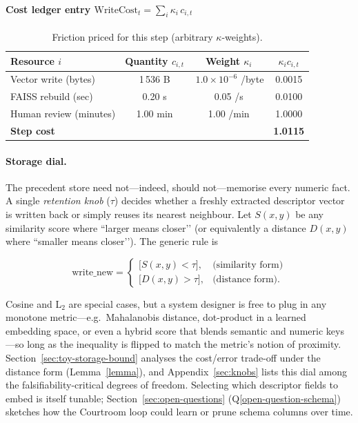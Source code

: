 \documentclass[11pt]{article}
\begin{document}
\paragraph{Cost ledger entry $\displaystyle\text{WriteCost}_t=\sum_i\kappa_i\,c_{i,t}$}

\begin{table}[h]
\centering\footnotesize
\begin{tabular}{@{}lccc@{}}
\toprule
Resource $i$ & Quantity $c_{i,t}$ & Weight $\kappa_i$ & $\kappa_i c_{i,t}$ \\ \midrule
Vector write (bytes)      & 1\,536 B & \,$1.0\times10^{-6}$ /byte & 0.0015 \\
FAISS rebuild (sec)       & 0.20 s   & 0.05 /s                 & 0.0100 \\
Human review (minutes)    & 1.00 min & 1.00 /min               & 1.0000 \\ \midrule
\textbf{Step cost}  & & &  \textbf{1.0115} \\ \bottomrule
\end{tabular}
\caption{Friction priced for this step (arbitrary $\kappa$-weights).}
\end{table}

\paragraph{Storage dial.}
The precedent store need not—indeed, should not—memorise every numeric
fact. A single \emph{retention knob} (\(\tau\)) decides whether a freshly
extracted descriptor vector is written back or simply reuses its nearest
neighbour. Let \(S(x,y)\) be any similarity score where “larger means
closer’’ (or equivalently a distance \(D(x,y)\) where “smaller means
closer’’). The generic rule is

\[
\text{write\_new} =
\begin{cases}
\bigl[S(x,y) < \tau\bigr], & \text{(similarity form)}\\[4pt]
\bigl[D(x,y) > \tau\bigr], & \text{(distance form)}.
\end{cases}
\]

Cosine and L$_2$ are special cases, but a system designer is free to
plug in any monotone metric—e.g.\ Mahalanobis distance, dot-product in a
learned embedding space, or even a hybrid score that blends semantic and
numeric keys—so long as the inequality is flipped to match the
metric's notion of proximity. Section~\ref{sec:toy-storage-bound} analyses the cost/error trade-off
under the distance form (Lemma~\ref{lemma}), and Appendix~\ref{sec:knobs} lists this dial
among the falsifiability-critical degrees of freedom. Selecting which descriptor 
fields to embed is itself tunable; Section~\ref{sec:open-questions} (Q\ref{open-question-schema}) sketches how the Courtroom loop 
could learn or prune schema columns over time.
\end{document}
